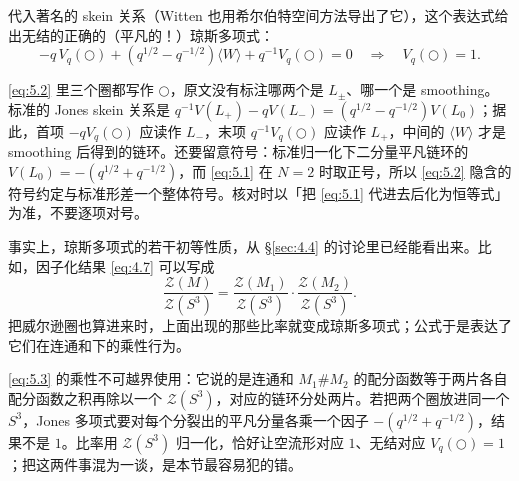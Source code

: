 代入著名的 skein 关系（Witten 也用希尔伯特空间方法导出了它），这个表达式给出无结的正确的（平凡的！）琼斯多项式：
\begin{equation}\tag{5.2}\label{eq:5.2}
  -q\,V_q(\bigcirc) + \left(q^{1/2}-q^{-1/2}\right)\langle W\rangle + q^{-1}V_q(\bigcirc) = 0
  \quad\Longrightarrow\quad V_q(\bigcirc) = 1 .
\end{equation}

\begin{yizhu}[易错点]
\eqref{eq:5.2} 里三个圈都写作 $\bigcirc$，原文没有标注哪两个是 $L_\pm$、哪一个是 smoothing。标准的 Jones skein 关系是 $q^{-1}V(L_+)-qV(L_-)=(q^{1/2}-q^{-1/2})V(L_0)$；据此，首项 $-qV_q(\bigcirc)$ 应读作 $L_-$，末项 $q^{-1}V_q(\bigcirc)$ 应读作 $L_+$，中间的 $\langle W\rangle$ 才是 smoothing 后得到的链环。还要留意符号：标准归一化下二分量平凡链环的 $V(L_0)=-(q^{1/2}+q^{-1/2})$，而 \eqref{eq:5.1} 在 $N=2$ 时取正号，所以 \eqref{eq:5.2} 隐含的符号约定与标准形差一个整体符号。核对时以「把 \eqref{eq:5.1} 代进去后化为恒等式」为准，不要逐项对号。
\end{yizhu}

事实上，琼斯多项式的若干初等性质，从 \S\ref{sec:4.4} 的讨论里已经能看出来。比如，因子化结果 \eqref{eq:4.7} 可以写成
\begin{equation}\tag{5.3}\label{eq:5.3}
  \frac{\mathcal{Z}(M)}{\mathcal{Z}(S^3)}
  = \frac{\mathcal{Z}(M_1)}{\mathcal{Z}(S^3)}\cdot\frac{\mathcal{Z}(M_2)}{\mathcal{Z}(S^3)} .
\end{equation}
把威尔逊圈也算进来时，上面出现的那些比率就变成琼斯多项式；公式于是表达了它们在连通和下的乘性行为。

\begin{yizhu}[易错点]
\eqref{eq:5.3} 的乘性不可越界使用：它说的是连通和 $M_1\#M_2$ 的配分函数等于两片各自配分函数之积再除以一个 $\mathcal{Z}(S^3)$，对应的链环分处两片。若把两个圈放进同一个 $S^3$，Jones 多项式要对每个分裂出的平凡分量各乘一个因子 $-(q^{1/2}+q^{-1/2})$，结果不是 $1$。比率用 $\mathcal{Z}(S^3)$ 归一化，恰好让空流形对应 $1$、无结对应 $V_q(\bigcirc)=1$；把这两件事混为一谈，是本节最容易犯的错。
\end{yizhu}

